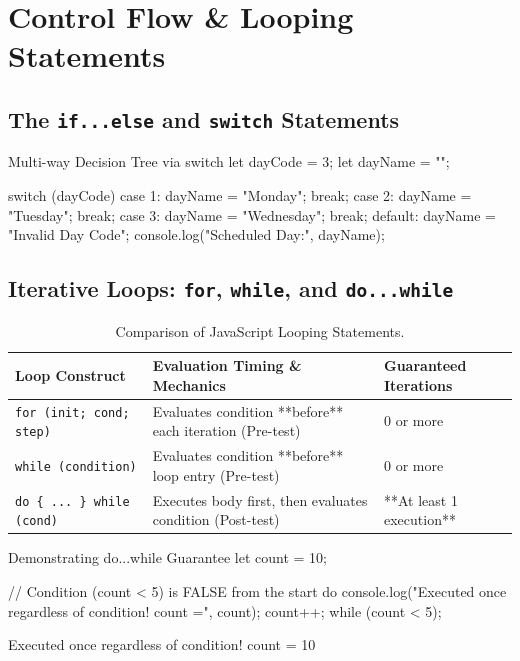\section{Control Flow \& Looping Statements}

\subsection{The \texttt{if...else} and \texttt{switch} Statements}
\begin{jscode}{Multi-way Decision Tree via switch}
let dayCode = 3;
let dayName = "";

switch (dayCode) {
    case 1:
        dayName = "Monday";
        break;
    case 2:
        dayName = "Tuesday";
        break;
    case 3:
        dayName = "Wednesday";
        break;
    default:
        dayName = "Invalid Day Code";
}
console.log("Scheduled Day:", dayName);
\end{jscode}

\subsection{Iterative Loops: \texttt{for}, \texttt{while}, and \texttt{do...while}}

\begin{table}[htbp]
\centering
\small
\renewcommand{\arraystretch}{1.3}
\begin{tabularx}{\linewidth}{l>{\raggedright\arraybackslash}Xl}
\toprule
\textbf{Loop Construct} & \textbf{Evaluation Timing \& Mechanics} & \textbf{Guaranteed Iterations} \\
\midrule
\texttt{for (init; cond; step)} & Evaluates condition **before** each iteration (Pre-test) & $0$ or more \\
\texttt{while (condition)} & Evaluates condition **before** loop entry (Pre-test) & $0$ or more \\
\texttt{do \{ ... \} while (cond)} & Executes body first, then evaluates condition (Post-test) & **At least 1 execution** \\
\bottomrule
\end{tabularx}
\caption{Comparison of JavaScript Looping Statements.}
\label{tab:js-loops}
\end{table}

\begin{jscode}{Demonstrating do...while Guarantee}
let count = 10;

// Condition (count < 5) is FALSE from the start
do {
    console.log("Executed once regardless of condition! count =", count);
    count++;
} while (count < 5);
\end{jscode}
\begin{outputbox}
Executed once regardless of condition! count = 10
\end{outputbox}

